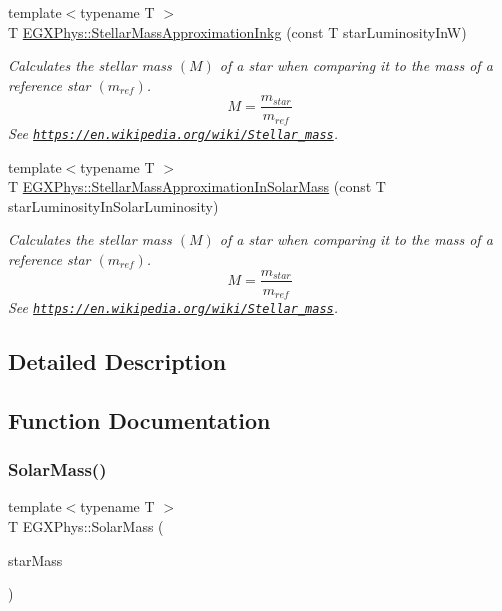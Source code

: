 \begin{DoxyCompactItemize}
{\footnotesize template$<$typename T $>$ }\\T \mbox{\hyperlink{group___e_g_x_phys-_stellar_mass_ga1863cc210a7e0aa0c681774e719fcd21}{E\+G\+X\+Phys\+::\+Stellar\+Mass\+Approximation\+Inkg}} (const T star\+Luminosity\+InW)
\begin{DoxyCompactList}\small\item\em Calculates the stellar mass $(M)$ of a star when comparing it to the mass of a reference star $(m_{ref})$. \[M=\frac{m_{star}}{m_{ref}}\] See \href{https://en.wikipedia.org/wiki/Stellar_mass}{\tt https\+://en.\+wikipedia.\+org/wiki/\+Stellar\+\_\+mass}. \end{DoxyCompactList}\item 
{\footnotesize template$<$typename T $>$ }\\T \mbox{\hyperlink{group___e_g_x_phys-_stellar_mass_ga8d4792aff66d53698461f73b1d25e3cc}{E\+G\+X\+Phys\+::\+Stellar\+Mass\+Approximation\+In\+Solar\+Mass}} (const T star\+Luminosity\+In\+Solar\+Luminosity)
\begin{DoxyCompactList}\small\item\em Calculates the stellar mass $(M)$ of a star when comparing it to the mass of a reference star $(m_{ref})$. \[M=\frac{m_{star}}{m_{ref}}\] See \href{https://en.wikipedia.org/wiki/Stellar_mass}{\tt https\+://en.\+wikipedia.\+org/wiki/\+Stellar\+\_\+mass}. \end{DoxyCompactList}\end{DoxyCompactItemize}


\subsection{Detailed Description}


\subsection{Function Documentation}
\mbox{\label{group___e_g_x_phys-_stellar_mass_ga4988f903a27ec9cfa63f72b003d876fd}} 
\subsubsection{\texorpdfstring{Solar\+Mass()}{SolarMass()}}
{\footnotesize\ttfamily template$<$typename T $>$ \\
T E\+G\+X\+Phys\+::\+Solar\+Mass (\begin{DoxyParamCaption}\item[{const T}]{star\+Mass }\end{DoxyParamCaption})}



